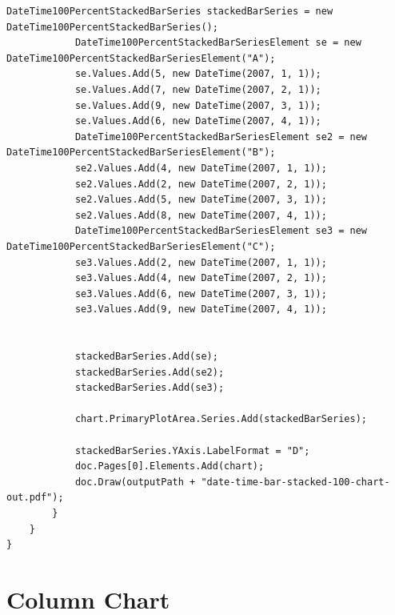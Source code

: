 \documentclass[american]{tufte-book}
\numberwithin{equation}{section}
\numberwithin{figure}{section}
\begin{document}
{\begin{lstlisting}[caption={Stacked 100\% data/time bar chart.},label={lis:Stacked-100=000025-data/time},basicstyle={\footnotesize\ttfamily},breaklines=true]
            DateTime100PercentStackedBarSeries stackedBarSeries = new DateTime100PercentStackedBarSeries();
            DateTime100PercentStackedBarSeriesElement se = new DateTime100PercentStackedBarSeriesElement("A");
            se.Values.Add(5, new DateTime(2007, 1, 1));
            se.Values.Add(7, new DateTime(2007, 2, 1));
            se.Values.Add(9, new DateTime(2007, 3, 1));
            se.Values.Add(6, new DateTime(2007, 4, 1));
            DateTime100PercentStackedBarSeriesElement se2 = new DateTime100PercentStackedBarSeriesElement("B");
            se2.Values.Add(4, new DateTime(2007, 1, 1));
            se2.Values.Add(2, new DateTime(2007, 2, 1));
            se2.Values.Add(5, new DateTime(2007, 3, 1));
            se2.Values.Add(8, new DateTime(2007, 4, 1));
            DateTime100PercentStackedBarSeriesElement se3 = new DateTime100PercentStackedBarSeriesElement("C");
            se3.Values.Add(2, new DateTime(2007, 1, 1));
            se3.Values.Add(4, new DateTime(2007, 2, 1));
            se3.Values.Add(6, new DateTime(2007, 3, 1));
            se3.Values.Add(9, new DateTime(2007, 4, 1));

           
            stackedBarSeries.Add(se);
            stackedBarSeries.Add(se2);
            stackedBarSeries.Add(se3);

            chart.PrimaryPlotArea.Series.Add(stackedBarSeries);

            stackedBarSeries.YAxis.LabelFormat = "D";
            doc.Pages[0].Elements.Add(chart);
            doc.Draw(outputPath + "date-time-bar-stacked-100-chart-out.pdf");
        }
    }
}
\end{lstlisting}
\leavevmode\egroup

\section{Column Chart}\label{sec:Column-Chart}

}
\end{document}

